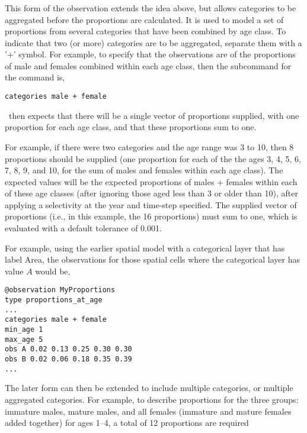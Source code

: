 {{{{\subsubsection*{}

This form of the observation extends the idea above, but allows categories to be aggregated before the proportions are calculated. It is used to model a set of proportions from several categories that have been combined by age class. To indicate that two (or more) categories are to be aggregated, separate them with a '+' symbol. For example, to specify that the observations are of the proportions of male and females combined within each age class, then the subcommand  for the  command is,

{\small{\begin{verbatim}
categories male + female
\end{verbatim}}}

\SPM\ then expects that there will be a single vector of proportions supplied, with one proportion for each age class, and that these proportions sum to one. 

For example, if there were two categories and the age range was 3 to 10, then 8 proportions should be supplied (one proportion for each of the the ages 3, 4, 5, 6, 7, 8, 9, and 10, for the sum of males and females within each age class). The expected values will be the expected proportions of males + females within each of these age classes (after ignoring those aged less than 3 or older than 10), after applying a selectivity at the year and time-step specified. The supplied vector of proportions (i.e., in this example, the 16 proportions) must sum to one, which is evaluated with a default tolerance of 0.001. 

For example, using the earlier spatial model with a categorical layer that has label Area, the observations for those spatial cells where the categorical layer has value $A$ would be, 

{\small{\begin{verbatim}
@observation MyProportions
type proportions_at_age
...
categories male + female
min_age 1
max_age 5
obs A 0.02 0.13 0.25 0.30 0.30
obs B 0.02 0.06 0.18 0.35 0.39
...
\end{verbatim}

The later form can then be extended to include multiple categories, or multiple aggregated categories. For example, to describe proportions for the three groups: immature males, mature males, and all females (immature and mature females added together) for ages 1--4, a total of 12 proportions are required 

}}}}}}
